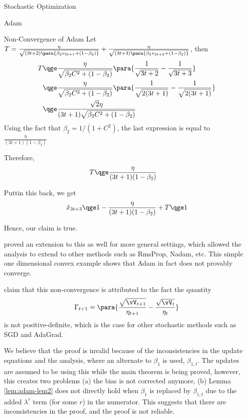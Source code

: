 \documentclass{article}
\begin{document}
\begin{psection}{Stochastic Optimization}
\begin{psubsection}{Adam}
\begin{pssubsection}{Non-Convergence of Adam}
			Let $T = \frac{\eta}{\sqrt{(3t + 2) \para{\beta_2 v_{3t + 1} + (1 - \beta_2)}}} + \frac{\eta}{\sqrt{(3t + 3) \para{\beta_2 v_{3t + 2} + (1 - \beta_2)}}}$, then
			\begin{align*}
				T	&\qge	\frac{\eta}{\sqrt{\beta_2 C^2 + (1 - \beta_2)}} \para{\frac{1}{\sqrt{3t + 2}} - \frac{1}{\sqrt{3t + 3}}} \\
				&\qge		\frac{\eta}{\sqrt{\beta_2 C^2 + (1 - \beta_2)}} \para{\frac{1}{\sqrt{2(3t + 1)}} - \frac{1}{\sqrt{2 (3t + 1)}}} \\
				&\qge		\frac{\sqrt{2} \eta}{(3t + 1) \sqrt{\beta_2 C^2 + (1 - \beta_2)}}
			\end{align*}
			Using the fact that $\beta_2 = 1 / (1 + C^2)$, the last expression is equal to $\frac{\eta}{(3t + 1)(1 - \beta_2)}$

			Therefore,
			\begin{align*}
				T	&\qge	\frac{\eta}{(3t + 1)(1 - \beta_2)}
			\end{align*}

			Puttin this back, we get
			\begin{align*}
				\hat{x}_{3t + 3}	\qge	1 - \frac{\eta}{(3t + 1)(1 - \beta_2)} + T  \qge 1
			\end{align*}

			Hence, our claim is true.

			\cite{non-adam} proved an extension to this as well for more general settings, which allowed the analysis to extend to other methods such as RmsProp, Nadam, etc. This simple one dimensional convex example shows that Adam in fact does not provably converge.

		\end{pssubsection}

		\cite{non-adam} claim that this non-convergence is attributed to the fact the quantity
		\begin{align*}
			\Gamma_{t + 1} = \para{\frac{\sqrt{\vV_{t + 1}}}{\eta_{t + 1}} - \frac{\sqrt{\vV_{t}}}{\eta_t}}
		\end{align*}
		is not positive-definite, which is the case for other stochastic methods such as SGD and AdaGrad.

		\begin{remark}
			We believe that the proof is invalid because of the inconsistencies in the update equations and the analysis, where an alternate to $\beta_1$ is used, \ie $\beta_{1, t}$. The updates are assumed to be using this while the main theorem is being proved, however, this creates two problems (a) the bias is not corrected anymore, (b) Lemma \ref{lem:adam-lem2} does not directly hold when $\beta_1$ is replaced by $\beta_{1, t}$ due to the added $\lambda^r$ term (for some $r$) in the numerator. This suggests that there are inconsistencies in the proof, and the proof is not reliable.
		\end{remark}


\end{psubsection}
\end{psection}
\end{document}
